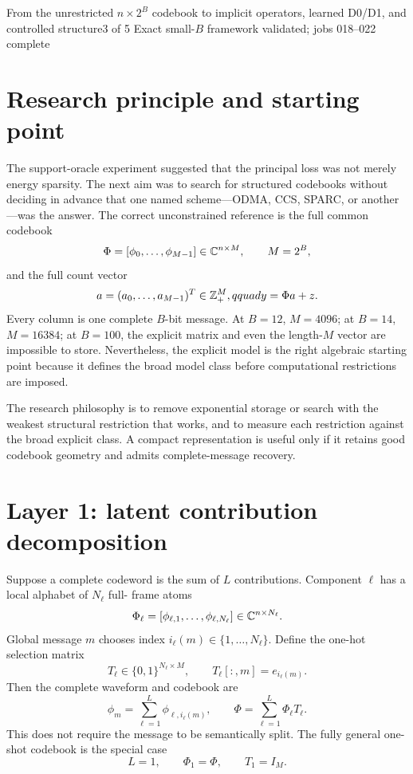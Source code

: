 \documentclass[11pt]{article}
\begin{document}
{From the unrestricted $n\times2^B$ codebook to implicit operators, learned D0/D1, and controlled structure}{3 of 5}
{Exact small-$B$ framework validated; jobs 018--022 complete}

\section{Research principle and starting point}

The support-oracle experiment suggested that the principal loss was not merely energy sparsity. The next aim was to
search for structured codebooks without deciding in advance that one named scheme---ODMA, CCS, SPARC, or another---was
the answer. The correct unconstrained reference is the full common codebook
\[
 \Phi=[\phi_0,\ldots,\phi_{M-1}]\in\mathbb{C}^{n\times M},\qquad M=2^B,
\]
and the full count vector
\[
 a=(a_0,\ldots,a_{M-1})^T\in\mathbb{Z}_+^M,qquad y=\Phi a+z.
\]
Every column is one complete $B$-bit message. At $B=12$, $M=4096$; at $B=14$, $M=16384$; at $B=100$, the explicit
matrix and even the length-$M$ vector are impossible to store. Nevertheless, the explicit model is the right algebraic
starting point because it defines the broad model class before computational restrictions are imposed.

The research philosophy is to remove exponential storage or search with the weakest structural restriction that works,
and to measure each restriction against the broad explicit class. A compact representation is useful only if it retains
good codebook geometry and admits complete-message recovery.

\section{Layer 1: latent contribution decomposition}

Suppose a complete codeword is the sum of $L$ contributions. Component $\ell$ has a local alphabet of $N_\ell$ full-
frame atoms
\[
 \Phi_\ell=[\phi_{\ell,1},\ldots,\phi_{\ell,N_\ell}]
 \in\mathbb{C}^{n\times N_\ell}.
\]
Global message $m$ chooses index $i_\ell(m)\in\{1,\ldots,N_\ell\}$. Define the one-hot selection matrix
\[
 T_\ell\in\{0,1\}^{N_\ell\times M},\qquad T_\ell[:,m]=e_{i_\ell(m)}.
\]
Then the complete waveform and codebook are
\[
 \phi_m=\sum_{\ell=1}^L\phi_{\ell,i_\ell(m)},
 \qquad
 \boxed{\Phi=\sum_{\ell=1}^L\Phi_\ell T_\ell.}
\]
This does not require the message to be semantically split. The fully general one-shot codebook is the special case
\[
 L=1,\qquad \Phi_1=\Phi,\qquad T_1=I_M.
\]
\end{document}
